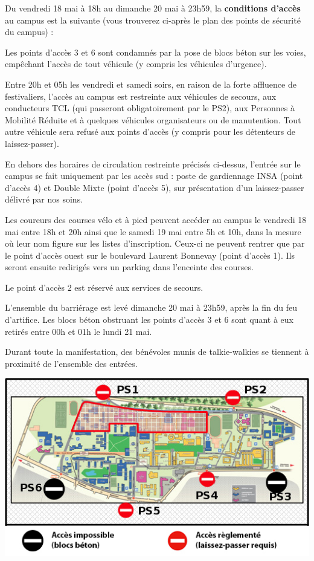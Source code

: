 \documentclass[hidelinks, paper=a4, fontsize=13pt]{report}
\begin{document}
Du vendredi 18 mai à 18h au dimanche 20 mai à 23h59, la \textbf{conditions d’accès} au campus est la suivante (vous trouverez ci-après le plan des points de sécurité du campus) :
\begin{list}{•}{}
	\item Les points d'accès 3 et 6 sont condamnés par la pose de blocs béton sur les voies, empêchant l'accès de tout véhicule (y compris les véhicules d'urgence).
	\item Entre 20h et 05h les vendredi et samedi soirs, en raison de la forte affluence de festivaliers, l'accès au campus est restreinte aux véhicules de secours, aux conducteurs TCL (qui passeront obligatoirement par le PS2), aux Personnes à Mobilité Réduite et à quelques véhicules organisateurs ou de manutention. Tout autre véhicule sera refusé aux points d'accès (y compris pour les détenteurs de laissez-passer).
	\item En dehors des horaires de circulation restreinte précisés ci-dessus, l’entrée sur le campus se fait uniquement par les accès sud : poste de gardiennage INSA (point d'accès 4) et Double Mixte (point d'accès 5), sur présentation d’un laissez-passer délivré par nos soins. 
	\item Les coureurs des courses vélo et à pied peuvent accéder au campus le vendredi 18 mai entre 18h et 20h ainsi que le samedi 19 mai entre 5h et 10h, dans la mesure où leur nom figure sur les listes d’inscription. Ceux-ci ne peuvent rentrer que par le point d'accès ouest sur le boulevard Laurent Bonnevay (point d'accès 1). Ils seront ensuite redirigés vers un parking dans l’enceinte des courses.
	\item Le point d'accès 2 est réservé aux services de secours.
	\item L’ensemble du barriérage est levé dimanche 20 mai à 23h59, après la fin du feu d’artifice. Les blocs béton obstruant les points d'accès 3 et 6 sont quant à eux retirés entre 00h et 01h le lundi 21 mai.
	\item Durant toute la manifestation, des bénévoles munis de talkie-walkies se tiennent à proximité de l’ensemble des entrées.
\end{list}

\begin{center}
	\includegraphics[scale=0.8]{Annexes/Plans/pointsSecu}
\end{center}
\end{document}
